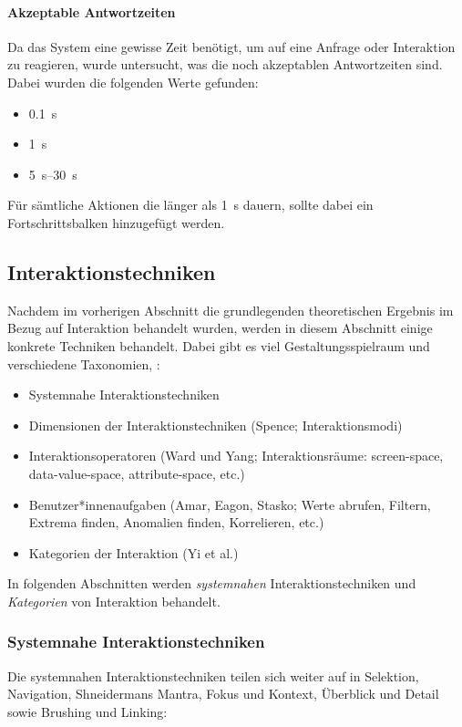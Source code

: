 				\paragraph{Akzeptable Antwortzeiten}
					Da das System eine gewisse Zeit benötigt, um auf eine Anfrage oder Interaktion zu reagieren, wurde untersucht, was die noch akzeptablen Antwortzeiten sind. Dabei wurden die folgenden Werte gefunden:
					\begin{itemize}
						\item {} \SI{0.1}{\second}
						\item {}                               \SI{1}{\second}
						\item {}                                                 \SIrange{5}{30}{\second}
					\end{itemize}
					Für sämtliche Aktionen die länger als \SI{1}{\second} dauern, sollte dabei ein Fortschrittsbalken hinzugefügt werden.

		\subsection{Interaktionstechniken}
			Nachdem im vorherigen Abschnitt die grundlegenden theoretischen Ergebnis im Bezug auf Interaktion behandelt wurden, werden in diesem Abschnitt einige konkrete Techniken behandelt. Dabei gibt es viel Gestaltungsspielraum und verschiedene Taxonomien, \zB:
			\begin{itemize}
				\item Systemnahe Interaktionstechniken
				\item Dimensionen der Interaktionstechniken (Spence; Interaktionsmodi)
				\item Interaktionsoperatoren (Ward und Yang; Interaktionsräume: screen-space, data-value-space, attribute-space, etc.)
				\item Benutzer*innenaufgaben (Amar, Eagon, Stasko; Werte abrufen, Filtern, Extrema finden, Anomalien finden, Korrelieren, etc.)
				\item Kategorien der Interaktion (Yi et al.)
			\end{itemize}
			In folgenden Abschnitten werden \emph{systemnahen} Interaktionstechniken und \emph{Kategorien} von Interaktion behandelt.

			\subsubsection{Systemnahe Interaktionstechniken}
				Die systemnahen Interaktionstechniken teilen sich weiter auf in Selektion, Navigation, Shneidermans Mantra, Fokus und Kontext, Überblick und Detail sowie Brushing und Linking:


